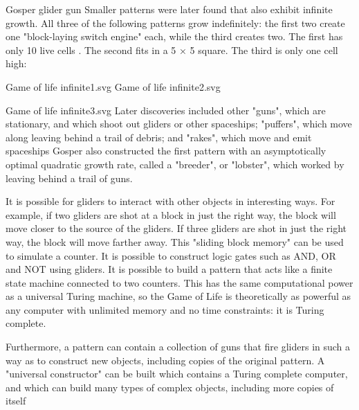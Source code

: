 Gosper glider gun
Smaller patterns were later found that also exhibit infinite growth. All three of the following patterns grow indefinitely: the first two create one "block-laying switch engine" each, while the third creates two. The first has only 10 live cells . The second fits in a 5 × 5 square. The third is only one cell high:

Game of life infinite1.svg     Game of life infinite2.svg

Game of life infinite3.svg
Later discoveries included other "guns", which are stationary, and which shoot out gliders or other spaceships; "puffers", which move along leaving behind a trail of debris; and "rakes", which move and emit spaceships Gosper also constructed the first pattern with an asymptotically optimal quadratic growth rate, called a "breeder", or "lobster", which worked by leaving behind a trail of guns.

It is possible for gliders to interact with other objects in interesting ways. For example, if two gliders are shot at a block in just the right way, the block will move closer to the source of the gliders. If three gliders are shot in just the right way, the block will move farther away. This "sliding block memory" can be used to simulate a counter. It is possible to construct logic gates such as AND, OR and NOT using gliders. It is possible to build a pattern that acts like a finite state machine connected to two counters. This has the same computational power as a universal Turing machine, so the Game of Life is theoretically as powerful as any computer with unlimited memory and no time constraints: it is Turing complete.

Furthermore, a pattern can contain a collection of guns that fire gliders in such a way as to construct new objects, including copies of the original pattern. A "universal constructor" can be built which contains a Turing complete computer, and which can build many types of complex objects, including more copies of itself
